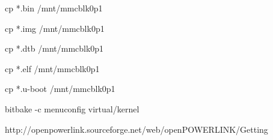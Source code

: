 cp *.bin /mnt/mmcblk0p1

cp *.img /mnt/mmcblk0p1

cp *.dtb /mnt/mmcblk0p1

cp *.elf /mnt/mmcblk0p1

cp *.u-boot /mnt/mmcblk0p1



bitbake -c menuconfig virtual/kernel





http://openpowerlink.sourceforge.net/web/openPOWERLINK/Getting%



